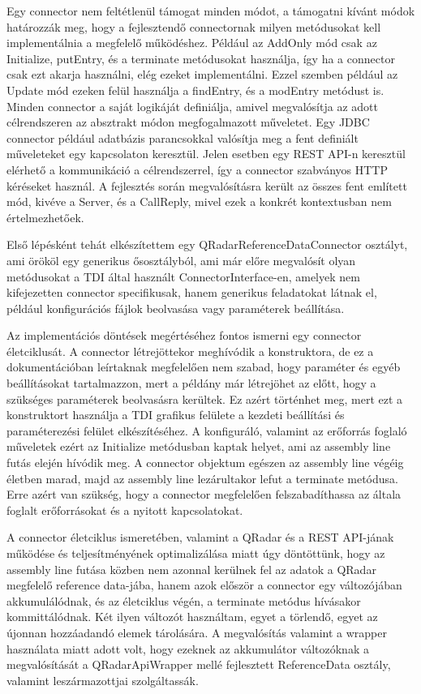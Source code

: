 Egy connector nem feltétlenül támogat minden módot, a támogatni kívánt módok határozzák meg, hogy a fejlesztendő connectornak milyen metódusokat kell implementálnia a megfelelő működéshez. 
Például az AddOnly mód csak az Initialize, putEntry, és a terminate metódusokat használja, így ha a connector csak ezt akarja használni, elég ezeket implementálni. Ezzel szemben például az Update mód ezeken felül használja a findEntry, és a modEntry metódust is. Minden connector a saját logikáját definiálja, amivel megvalósítja az adott célrendszeren az absztrakt módon megfogalmazott műveletet. Egy JDBC connector például adatbázis parancsokkal valósítja meg a fent definiált műveleteket egy kapcsolaton keresztül. Jelen esetben egy REST API-n keresztül elérhető a kommunikáció a célrendszerrel, így a connector szabványos HTTP kéréseket használ. A fejlesztés során megvalósításra került az összes fent említett mód, kivéve a Server, és a CallReply, mivel ezek a konkrét kontextusban nem értelmezhetőek.

Első lépésként tehát elkészítettem egy QRadarReferenceDataConnector osztályt, ami örököl egy generikus ősosztályból, ami már előre megvalósít olyan metódusokat a TDI által használt ConnectorInterface-en, amelyek nem kifejezetten connector specifikusak, hanem generikus feladatokat látnak el, például konfigurációs fájlok beolvasása vagy paraméterek beállítása.

Az implementációs döntések megértéséhez fontos ismerni egy connector életciklusát. A connector létrejöttekor meghívódik a konstruktora, de ez a dokumentációban leírtaknak megfelelően nem szabad, hogy paraméter és egyéb beállításokat tartalmazzon, mert a példány már létrejöhet az előtt, hogy a szükséges paraméterek beolvasásra kerültek. Ez azért történhet meg, mert ezt a konstruktort használja a TDI grafikus felülete a kezdeti beállítási és paraméterezési felület elkészítéséhez. A konfiguráló, valamint az erőforrás foglaló műveletek ezért az Initialize metódusban kaptak helyet, ami az assembly line futás elején hívódik meg. A connector objektum egészen az assembly line végéig életben marad, majd az assembly line lezárultakor lefut a terminate metódusa. Erre azért van szükség, hogy a connector megfelelően felszabadíthassa az általa foglalt erőforrásokat és a nyitott kapcsolatokat.

A connector életciklus ismeretében, valamint a QRadar és a REST API-jának működése és teljesítményének optimalizálása miatt úgy döntöttünk, hogy az assembly line futása közben nem azonnal kerülnek fel az adatok a QRadar megfelelő reference data-jába, hanem azok először a connector egy változójában akkumulálódnak, és az életciklus végén, a terminate metódus hívásakor kommittálódnak. Két ilyen változót használtam, egyet a törlendő, egyet az újonnan hozzáadandó elemek tárolására. A megvalósítás valamint a wrapper használata miatt adott volt, hogy ezeknek az akkumulátor változóknak a megvalósítását a QRadarApiWrapper mellé fejlesztett ReferenceData osztály, valamint leszármazottjai szolgáltassák.

